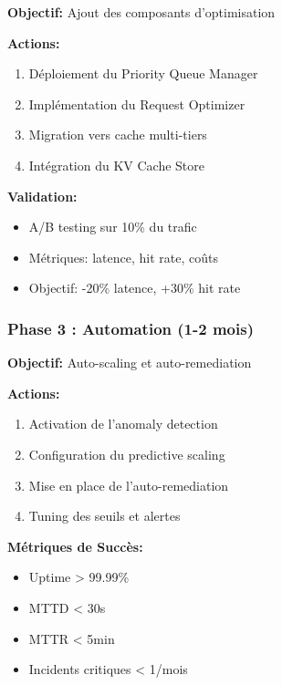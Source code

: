 \documentclass[12pt,a4paper]{article}
\begin{document}
\begin{tcolorbox}[title=Phase 2: Composants Intelligents,colback=green!5]
\textbf{Objectif:} Ajout des composants d'optimisation

\textbf{Actions:}
\begin{enumerate}[noitemsep]
    \item Déploiement du Priority Queue Manager
    \item Implémentation du Request Optimizer
    \item Migration vers cache multi-tiers
    \item Intégration du KV Cache Store
\end{enumerate}

\textbf{Validation:}
\begin{itemize}[noitemsep]
    \item A/B testing sur 10\% du trafic
    \item Métriques: latence, hit rate, coûts
    \item Objectif: -20\% latence, +30\% hit rate
\end{itemize}
\end{tcolorbox}

\subsubsection{Phase 3 : Automation (1-2 mois)}

\begin{tcolorbox}[title=Phase 3: Automatisation Complète,colback=orange!5]
\textbf{Objectif:} Auto-scaling et auto-remediation

\textbf{Actions:}
\begin{enumerate}[noitemsep]
    \item Activation de l'anomaly detection
    \item Configuration du predictive scaling
    \item Mise en place de l'auto-remediation
    \item Tuning des seuils et alertes
\end{enumerate}

\textbf{Métriques de Succès:}
\begin{itemize}[noitemsep]
    \item Uptime > 99.99\%
    \item MTTD < 30s
    \item MTTR < 5min
    \item Incidents critiques < 1/mois
\end{itemize}
\end{tcolorbox}
\end{document}
